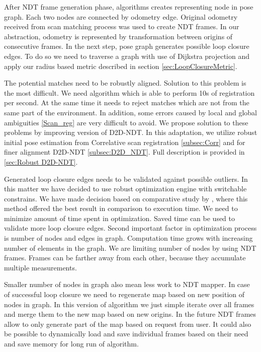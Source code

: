 After \gls{NDT} frame generation phase, algorithms creates representing node in pose graph. Each two nodes are connected by odometry edge. Original odometry received from scan matching process was used to create \gls{NDT} frames. In our abstraction, odometry is represented by transformation between origins of consecutive frames. In the next step, pose graph generates possible loop closure edges. To do so we need to traverse a graph with use of Dijkstra projection and apply our radius based metric described in section \ref{sec:LoopClosureMetric}. 

The potential matches need to be robustly aligned. Solution to this problem is the most difficult. We need algorithm which is able to perform 10s of registration per second. At the same time it needs to reject matches which are not from the same part of the environment. In addition, some errors caused by local and global ambiguities \ref{Scan_reg} are very difficult to avoid. We propose solution to these problems by improving version of \gls{D2D}-\gls{NDT}. In this adaptation, we utilize robust initial pose estimation from Correlative scan registration \ref{subsec:Corr} and for finer alignment \gls{D2D}-\gls{NDT} \ref{subsec:D2D_NDT}. Full description is provided in \ref{sec:Robust D2D-NDT}.

Generated loop closure edges needs to be validated against possible outliers. In this matter we have decided to use robust optimization engine with switchable constrains. We have made decision based on comparative study by \cite{RobustOpt}, where this method offered the best result in comparison to execution time. We need to minimize amount of time spent in optimization. Saved time can be used to validate more loop closure edges. Second important factor in optimization process is number of nodes and edges in graph. Computation time grows with increasing number of elements in the graph. We are limiting number of nodes by using \gls{NDT} frames. Frames can be farther away from each other, because they accumulate multiple measurements.

Smaller number of nodes in graph also mean less work to \gls{NDT} mapper. In case of successful loop closure we need to regenerate map based on new position of nodes in graph. In this version of algorithm we just simple iterate over all frames and merge them to the new map based on new origins. In the future \gls{NDT} frames allow to only generate part of the map based on request from user. It could also be possible to dynamically load and save individual frames based on their need and save memory for long run of algorithm.

